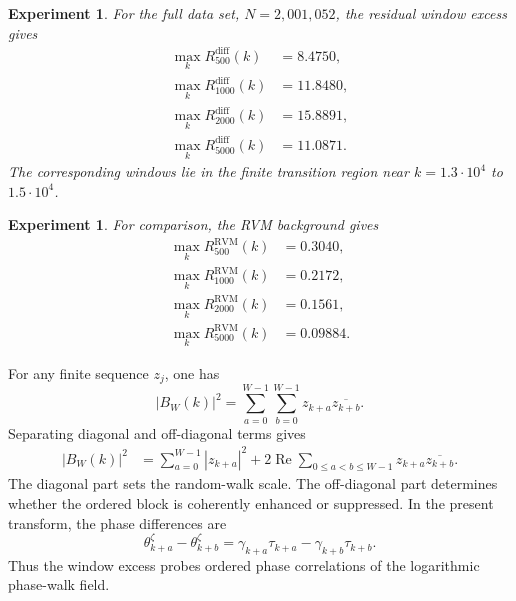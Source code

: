 \documentclass[12pt]{article}
\numberwithin{equation}{section}
\newtheorem{experiment}[theorem]{Experiment}
\newcommand{\RVM}{\mathrm{RVM}}
\newcommand{\diff}{\mathrm{diff}}
\begin{document}
\begin{experiment}
\label{exp:residual_window_excess}
For the full data set, \(N=2,001,052\), the residual window excess gives
\begin{align}
\max_k R_{500}^{\diff}(k)
&=
8.4750,
\label{eq:exp_residual_window_500}
\\
\max_k R_{1000}^{\diff}(k)
&=
11.8480,
\label{eq:exp_residual_window_1000}
\\
\max_k R_{2000}^{\diff}(k)
&=
15.8891,
\label{eq:exp_residual_window_2000}
\\
\max_k R_{5000}^{\diff}(k)
&=
11.0871.
\label{eq:exp_residual_window_5000}
\end{align}
The corresponding windows lie in the finite transition region near \(k=1.3\cdot 10^4\) to \(1.5\cdot 10^4\).
\end{experiment}

\begin{experiment}
\label{exp:rvm_window_comparison}
For comparison, the RVM background gives
\begin{align}
\max_k R_{500}^{\RVM}(k)
&=
0.3040,
\label{eq:exp_rvm_window_500}
\\
\max_k R_{1000}^{\RVM}(k)
&=
0.2172,
\label{eq:exp_rvm_window_1000}
\\
\max_k R_{2000}^{\RVM}(k)
&=
0.1561,
\label{eq:exp_rvm_window_2000}
\\
\max_k R_{5000}^{\RVM}(k)
&=
0.09884.
\label{eq:exp_rvm_window_5000}
\end{align}
\end{experiment}

\noindent For any finite sequence \(z_j\), one has
\begin{equation}
|B_W(k)|^2
=
\sum_{a=0}^{W-1}\sum_{b=0}^{W-1}
z_{k+a}\overline{z_{k+b}}.
\label{eq:block_correlation_identity}
\end{equation}
Separating diagonal and off-diagonal terms gives
\begin{align}
|B_W(k)|^2
&=
\sum_{a=0}^{W-1}|z_{k+a}|^2
+
2\operatorname{Re}
\sum_{0\leq a<b\leq W-1}z_{k+a}\overline{z_{k+b}}.
\label{eq:block_correlation_offdiagonal}
\end{align}
The diagonal part sets the random-walk scale.  The off-diagonal part determines whether the ordered block is coherently enhanced or suppressed.  In the present transform, the phase differences are
\begin{equation}
\theta_{k+a}^\zeta-\theta_{k+b}^\zeta
=
\gamma_{k+a}\tau_{k+a}-\gamma_{k+b}\tau_{k+b}.
\label{eq:block_phase_difference}
\end{equation}
Thus the window excess probes ordered phase correlations of the logarithmic phase-walk field.
\end{document}
